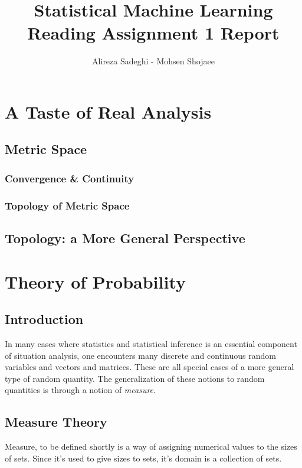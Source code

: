 \documentclass{article}
\title{Statistical Machine Learning \\ Reading Assignment 1 Report}
\author{Alireza Sadeghi - Mohsen Shojaee}
\begin{document}
\maketitle
    
\section{A Taste of Real Analysis}

\subsection{Metric Space}

\subsubsection{Convergence \& Continuity}

\subsubsection{Topology of Metric Space}

\subsection{Topology: a More General Perspective}

\section{Theory of Probability}

\subsection{Introduction}
In many cases where statistics and statistical inference is an essential component of situation analysis, one encounters many discrete and continuous random variables and vectors and matrices. These are all special cases of a more general type of random quantity. The generalization of these notions to random quantities is through a notion of \textit{measure}.

\subsection{Measure Theory}
Measure, to be defined shortly is a way of assigning numerical values to the sizes of sets. Since it's used to give sizes to sets, it's domain is a collection of sets.
\end{document}
